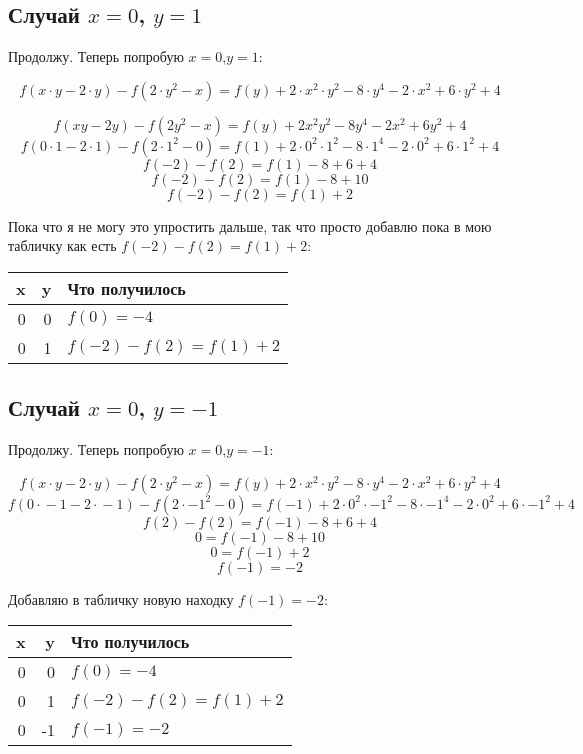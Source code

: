 \documentclass{article}
\begin{document}
\subsection{Случай $x=0$, $y=1$}
Продолжу. Теперь попробую {\boldmath $x=0$,$y=1$}:

$$f(x\cdot{}y-2\cdot{}y)-f(2\cdot{}y^2-x)=f(y)+2\cdot{}x^2\cdot{}y^2-8\cdot{}y^4-2\cdot{}x^2+6\cdot{}y^2+4$$


$$f(xy-2y)-f(2y^2-x)=f(y)+2x^2y^2-8y^4-2x^2+6y^2+4$$
$$f(0\cdot{}1-2\cdot{}1)-f(2\cdot{}1^2-0)=f(1)+2\cdot{}0^2\cdot{}1^2-8\cdot{}1^4-2\cdot{}0^2+6\cdot{}1^2+4$$
$$f(-2)-f(2)=f(1)-8+6+4$$
$$f(-2)-f(2)=f(1)-8+10$$
$$f(-2)-f(2)=f(1)+2$$

\begin{samepage}
Пока что я не могу это упростить дальше, так что просто добавлю пока в мою табличку как есть {\boldmath\color{red} $f(-2)-f(2)=f(1)+2$}: 
\begin{center}
 \begin{tabular}{r r l} 
 \hline
 x & y & Что получилось      \\
 \hline
 0 & 0 & $f(0)=-4$           \\
 0 & 1 & $f(-2)-f(2)=f(1)+2$ \\
 \hline
 \end{tabular}
\end{center}
\end{samepage}

\subsection{Случай $x=0$, $y=-1$}
Продолжу. Теперь попробую {\boldmath $x=0$,$y=-1$}:

$$f(x\cdot{}y-2\cdot{}y)-f(2\cdot{}y^2-x)=f(y)+2\cdot{}x^2\cdot{}y^2-8\cdot{}y^4-2\cdot{}x^2+6\cdot{}y^2+4$$
$$f(0\cdot{}-1-2\cdot{}-1)-f(2\cdot{}{-1}^2-0)=f(-1)+2\cdot{}0^2\cdot{}{-1}^2-8\cdot{}{-1}^4-2\cdot{}0^2+6\cdot{}{-1}^2+4$$
$$f(2)-f(2)=f(-1)-8+6+4$$
$$0=f(-1)-8+10$$
$$0=f(-1)+2$$
$$f(-1)=-2$$

\begin{samepage}
Добавляю в табличку новую находку {\boldmath\color{red} $f(-1)=-2$}:
\begin{center}
 \begin{tabular}{r r l} 
 \hline
 x & y & Что получилось       \\
 \hline
 0 &  0 & $f(0)=-4$           \\
 0 &  1 & $f(-2)-f(2)=f(1)+2$ \\
 0 & -1 & $f(-1)=-2$ \\
 \hline
 \end{tabular}
\end{center}
\end{samepage}
\end{document}
